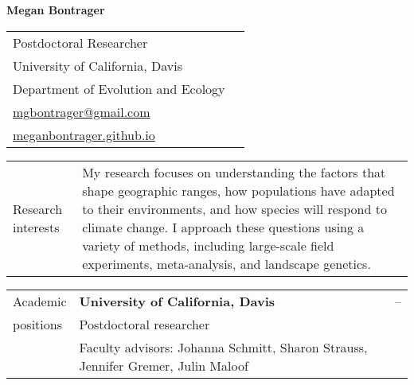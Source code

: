\documentclass[letterpaper,11pt,oneside]{article}
\begin{document}



\noindent  \LARGE{\textbf{Megan Bontrager}} 

\normalsize

\bigskip

\noindent \begin{tabular}{@{} p{8cm} >{\raggedleft\arraybackslash}p{8.11cm}}
Postdoctoral Researcher \\
University of California, Davis & \\
Department of Evolution and Ecology & \\
{\href{mailto:mgbontrager@gmail.com}{mgbontrager@gmail.com}} & \\
{\href{https://meganbontrager.github.io}{meganbontrager.github.io}} & \\

\end{tabular}
\vspace{1em}


\noindent\hrulefill 

\bigskip
\bigskip



\noindent \begin{tabular}{@{} p{3cm} p{13.11cm}}
\Large{Research interests} & My research focuses on understanding the factors that shape geographic ranges, how populations have adapted to their environments, and how species will respond to climate change. I approach these questions using a variety of methods, including large-scale field experiments, meta-analysis, and landscape genetics. \\
\end{tabular}
\bigskip



\noindent \begin{tabular}{@{} p{3cm} p{10.91cm} >{\raggedleft\arraybackslash}p{1.7cm}}
\Large{Academic}    & \textbf{University of California, Davis} & 2018--\hspace*{0.8cm} \\
\Large{positions}   & Postdoctoral researcher & \\
& \raggedright{Faculty advisors: Johanna Schmitt, Sharon Strauss, Jennifer Gremer, Julin Maloof} & \\
\end{tabular}
\bigskip
\end{document}
